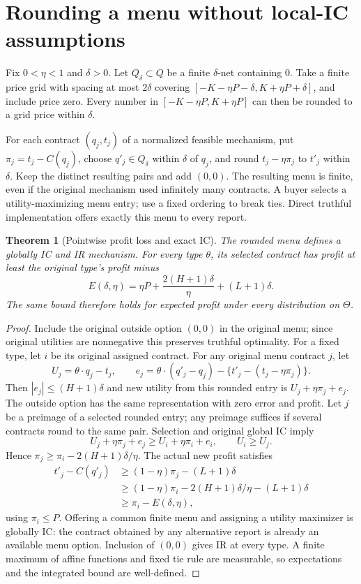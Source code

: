\documentclass[11pt]{article}
\newtheorem{theorem}{Theorem}
\theoremstyle{definition}
\theoremstyle{remark}
\begin{document}
\section{Rounding a menu without local-IC assumptions}
Fix $0<\eta<1$ and $\delta>0$. Let $Q_\delta\subset Q$ be a finite $\delta$-net containing $0$. Take a finite price grid with spacing at most $2\delta$ covering $[-K-\eta P-\delta,K+\eta P+\delta]$, and include price zero. Every number in $[-K-\eta P,K+\eta P]$ can then be rounded to a grid price within $\delta$.

For each contract $(q_j,t_j)$ of a normalized feasible mechanism, put $\pi_j=t_j-C(q_j)$, choose $q'_j\in Q_\delta$ within $\delta$ of $q_j$, and round $t_j-\eta\pi_j$ to $t'_j$ within $\delta$. Keep the distinct resulting pairs and add $(0,0)$. The resulting menu is finite, even if the original mechanism used infinitely many contracts. A buyer selects a utility-maximizing menu entry; use a fixed ordering to break ties. Direct truthful implementation offers exactly this menu to every report.

\begin{theorem}[Pointwise profit loss and exact IC]
The rounded menu defines a globally IC and IR mechanism. For every type $\theta$, its selected contract has profit at least the original type's profit minus
\begin{equation}
 E(\delta,\eta)=\eta P+\frac{2(H+1)\delta}{\eta}+(L+1)\delta.\label{eq:error}
\end{equation}
The same bound therefore holds for expected profit under every distribution on $\Theta$.
\end{theorem}
\begin{proof}
Include the original outside option $(0,0)$ in the original menu; since original utilities are nonnegative this preserves truthful optimality. For a fixed type, let $i$ be its original assigned contract. For any original menu contract $j$, let
\[
 U_j=\theta\cdot q_j-t_j,\qquad
 e_j=\theta\cdot(q'_j-q_j)-\{t'_j-(t_j-\eta\pi_j)\}.
\]
Then $|e_j|\le(H+1)\delta$ and new utility from this rounded entry is $U_j+\eta\pi_j+e_j$. The outside option has the same representation with zero error and profit. Let $j$ be a preimage of a selected rounded entry; any preimage suffices if several contracts round to the same pair. Selection and original global IC imply
\[
 U_j+\eta\pi_j+e_j\ge U_i+\eta\pi_i+e_i,
 \qquad U_i\ge U_j.
\]
Hence $\pi_j\ge\pi_i-2(H+1)\delta/\eta$. The actual new profit satisfies
\begin{align*}
 t'_j-C(q'_j)
 &\ge (1-\eta)\pi_j-(L+1)\delta\\
 &\ge (1-\eta)\pi_i-2(H+1)\delta/\eta-(L+1)\delta\\
 &\ge \pi_i-E(\delta,\eta),
\end{align*}
using $\pi_i\le P$. Offering a common finite menu and assigning a utility maximizer is globally IC: the contract obtained by any alternative report is already an available menu option. Inclusion of $(0,0)$ gives IR at every type. A finite maximum of affine functions and fixed tie rule are measurable, so expectations and the integrated bound are well-defined.
\end{proof}
\end{document}
